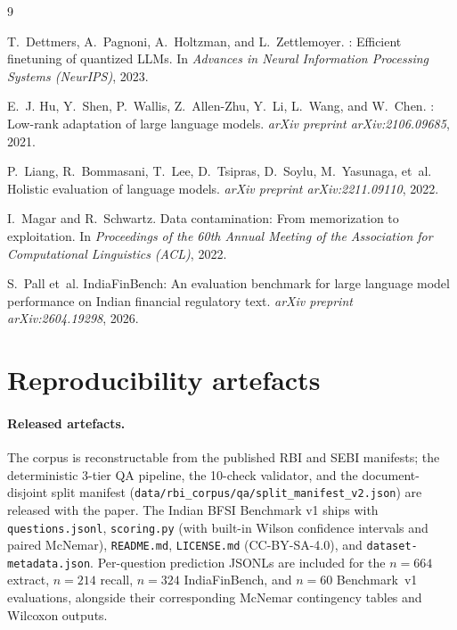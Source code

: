 \documentclass{article}
\begin{document}
{
\small



\begin{thebibliography}{9}

T.~Dettmers, A.~Pagnoni, A.~Holtzman, and L.~Zettlemoyer.
: Efficient finetuning of quantized {LLMs}.
\newblock In \emph{Advances in Neural Information Processing Systems (NeurIPS)}, 2023.

E.~J. Hu, Y.~Shen, P.~Wallis, Z.~Allen-Zhu, Y.~Li, L.~Wang, and W.~Chen.
: Low-rank adaptation of large language models.
\newblock \emph{arXiv preprint arXiv:2106.09685}, 2021.

P.~Liang, R.~Bommasani, T.~Lee, D.~Tsipras, D.~Soylu, M.~Yasunaga, et~al.
\newblock Holistic evaluation of language models.
\newblock \emph{arXiv preprint arXiv:2211.09110}, 2022.

I.~Magar and R.~Schwartz.
\newblock Data contamination: From memorization to exploitation.
\newblock In \emph{Proceedings of the 60th Annual Meeting of the Association for Computational Linguistics (ACL)}, 2022.

S.~Pall et~al.
\newblock IndiaFinBench: An evaluation benchmark for large language model performance on Indian financial regulatory text.
\newblock \emph{arXiv preprint arXiv:2604.19298}, 2026.

\end{thebibliography}
}

\appendix

\section{Reproducibility artefacts}

\paragraph{Released artefacts.} The corpus is reconstructable from the published RBI and SEBI manifests; the deterministic 3-tier QA pipeline, the 10-check validator, and the document-disjoint split manifest (\texttt{data/rbi\_corpus/qa/split\_manifest\_v2.json}) are released with the paper. The Indian BFSI Benchmark v1 ships with \texttt{questions.jsonl}, \texttt{scoring.py} (with built-in Wilson confidence intervals and paired McNemar), \texttt{README.md}, \texttt{LICENSE.md} (CC-BY-SA-4.0), and \texttt{dataset-metadata.json}. Per-question prediction JSONLs are included for the $n{=}664$ extract, $n{=}214$ recall, $n{=}324$ IndiaFinBench, and $n{=}60$ Benchmark~v1 evaluations, alongside their corresponding McNemar contingency tables and Wilcoxon outputs.
\end{document}
